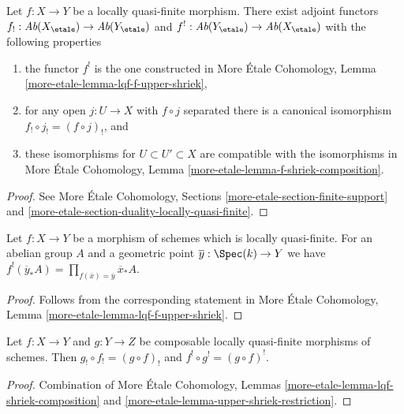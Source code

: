 \begin{proposition}
\label{proposition-lqf-shriek}
Let $f : X \to Y$ be a locally quasi-finite morphism. There exist
adjoint functors $f_! : \textit{Ab}(X_\etale) \to \textit{Ab}(Y_\etale)$
and $f^! : \textit{Ab}(Y_\etale) \to \textit{Ab}(X_\etale)$
with the following properties
\begin{enumerate}
\item the functor $f^!$ is the one constructed in More \'Etale Cohomology,
Lemma \ref{more-etale-lemma-lqf-f-upper-shriek},
\item for any open $j : U \to X$ with $f \circ j$ separated
there is a canonical isomorphism $f_! \circ j_! = (f \circ j)_!$, and
\item these isomorphisms for $U \subset U' \subset X$ are compatible
with the isomorphisms in More \'Etale Cohomology,
Lemma \ref{more-etale-lemma-f-shriek-composition}.
\end{enumerate}
\end{proposition}

\begin{proof}
See More \'Etale Cohomology, Sections
\ref{more-etale-section-finite-support} and
\ref{more-etale-section-duality-locally-quasi-finite}.
\end{proof}

\begin{lemma}
\label{lemma-lqf-f-upper-shriek-stalk}
Let $f : X \to Y$ be a morphism of schemes which is locally quasi-finite.
For an abelian group $A$ and a geometric point
$\overline{y} : \Spec(k) \to Y$ we have
$f^!(\overline{y}_*A) = \prod\nolimits_{f(\overline{x}) = \overline{y}}
\overline{x}_*A$.
\end{lemma}

\begin{proof}
Follows from the corresponding statement in
More \'Etale Cohomology, Lemma \ref{more-etale-lemma-lqf-f-upper-shriek}.
\end{proof}

\begin{lemma}
\label{lemma-lqf-f-shriek-composition}
Let $f : X \to Y$ and $g : Y \to Z$ be composable locally
quasi-finite morphisms of schemes. Then $g_! \circ f_! = (g \circ f)_!$
and $f^! \circ g^! = (g \circ f)^!$.
\end{lemma}

\begin{proof}
Combination of More \'Etale Cohomology, Lemmas
\ref{more-etale-lemma-lqf-shriek-composition} and
\ref{more-etale-lemma-upper-shriek-restriction}.
\end{proof}









